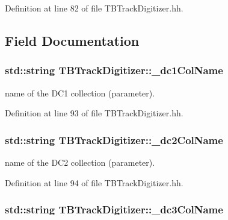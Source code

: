 Definition at line 82 of file T\-B\-Track\-Digitizer.\-hh.



\subsection{Field Documentation}
\subsubsection[{\-\_\-dc1\-Col\-Name}]{\setlength{\rightskip}{0pt plus 5cm}std\-::string T\-B\-Track\-Digitizer\-::\-\_\-dc1\-Col\-Name\hspace{0.3cm}{\ttfamily [protected]}}\label{classTBTrackDigitizer_ac1c60667782d5da7c3133fb8bc2a0fe6}


name of the D\-C1 collection (parameter). 



Definition at line 93 of file T\-B\-Track\-Digitizer.\-hh.

\subsubsection[{\-\_\-dc2\-Col\-Name}]{\setlength{\rightskip}{0pt plus 5cm}std\-::string T\-B\-Track\-Digitizer\-::\-\_\-dc2\-Col\-Name\hspace{0.3cm}{\ttfamily [protected]}}\label{classTBTrackDigitizer_a072d9fc3b2b51490f107f92c08cfd583}


name of the D\-C2 collection (parameter). 



Definition at line 94 of file T\-B\-Track\-Digitizer.\-hh.

\subsubsection[{\-\_\-dc3\-Col\-Name}]{\setlength{\rightskip}{0pt plus 5cm}std\-::string T\-B\-Track\-Digitizer\-::\-\_\-dc3\-Col\-Name\hspace{0.3cm}{\ttfamily [protected]}}\label{classTBTrackDigitizer_a371d605e218ee547903748baab348c60}


